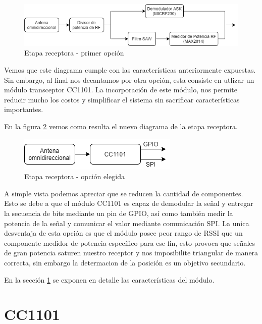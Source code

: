 \begin{figure}[htb]
	\centering
	\includegraphics[scale=0.6]{images/Opcion1.png}
    \caption{Etapa receptora - primer opción}
	\label{EtapaReceptora1}
\end{figure}


Vemos que este diagrama cumple con las características anteriormente expuestas. Sin embargo, al final nos decantamos por otra opción, 
esta consiste en utlizar un módulo transceptor CC1101. La incorporación de este módulo, nos permite reducir mucho los costos y simplificar
el sistema sin sacrificar características importantes. \par
En la figura \ref{EtapaReceptora2} vemos como resulta el nuevo diagrama de la etapa receptora. \par

\begin{figure}[htb]
	\centering
	\includegraphics[scale=0.6]{images/Opcion2.png}
    \caption{Etapa receptora - opción elegida}
	\label{EtapaReceptora2}
\end{figure}

A simple vista podemos apreciar que se reducen la cantidad de componentes. Esto se debe a que el módulo CC1101 es capaz de demodular la señal y
entregar la secuencia de bits mediante un pin de GPIO, así como también medir la potencia de la señal y comunicar el valor mediante comunicación SPI.
La unica desventaja de esta opción es que el módulo posee peor rango de RSSI que un componente medidor de potencia específico para ese fin,
esto provoca que señales de gran potencia saturen nuestro receptor y nos imposibilite triangular de manera correcta, sin embargo la determacion 
de la posición es un objetivo secundario. \par
En la sección \ref{cap:cc1101} se exponen en detalle las características del módulo.\par

\section{CC1101} \label{cap:cc1101}
